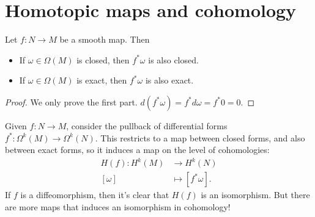 %

\section{Homotopic maps and cohomology}
\begin{lemma}
    Let $f: N \to  M$ be a smooth map.
    Then
    \begin{itemize}
        \item If $\omega \in \Omega(M) $ is closed, then $f^* \omega$ is also closed.
        \item If $\omega \in \Omega(M) $ is exact, then $f^* \omega$ is also exact.
    \end{itemize}
\end{lemma}
\begin{proof}
    We only prove the first part.
    $d(f^* \omega) = f^* d \omega = f^* 0 = 0$.
\end{proof}

Given $f: N \to  M$, consider the pullback of differential forms $f^*: \Omega^{k}(M) \to \Omega^{k}(N)$.
This restricts to a map between closed forms, and also between exact forms, so it induces a map on the level of cohomologies:
\begin{align*}
    H(f): H^{k}(M)  &\longrightarrow H^{k}(N)  \\
    [\omega] &\longmapsto [f^* \omega].
\end{align*}
If $f$ is a diffeomorphism,
then it's clear that $H(f)$ is an isomorphism.
But there are more maps that induces an isomorphism  in cohomology!

